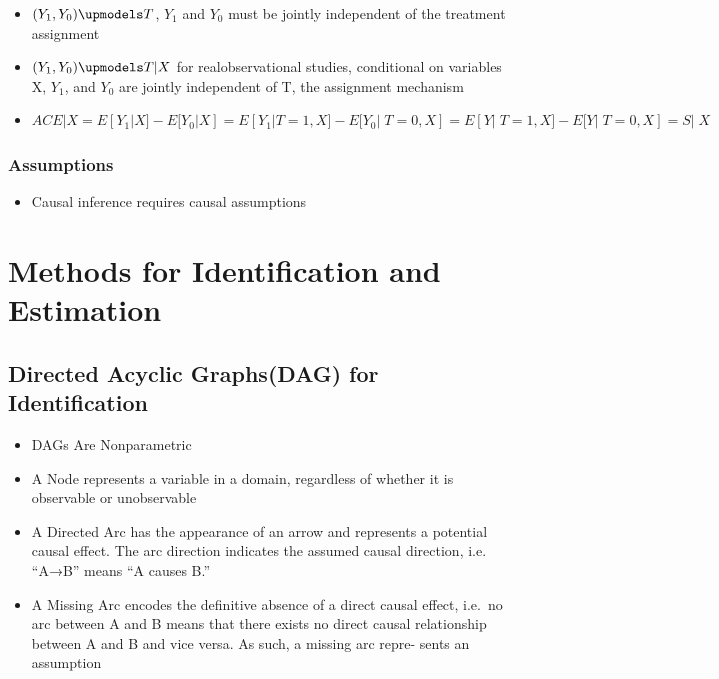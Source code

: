 \documentclass[]{book}
\providecommand{\tightlist}{%
  \setlength{\itemsep}{0pt}\setlength{\parskip}{0pt}}
\begin{document}
\begin{itemize}
\tightlist
\item
  \((Y_1,Y_0) \upmodels T\), \(Y_1\) and \(Y_0\) must be jointly independent of the treatment assignment
\item
  \((Y_1,Y_0) \upmodels T|X\) for realobservational studies, conditional on variables X, \(Y_1\), and \(Y_0\) are jointly independent of T, the assignment mechanism
\item
  \(ACE|X = E[Y_1|X] - E[Y_0|X] = E[Y_1|T=1,X] - E[Y_0|􏰀T = 0,X] = E[Y|􏰀T = 1,X] - E[Y|􏰀T =0,X] = S|􏰀X\)
\end{itemize}

\hypertarget{assumptions}{%
\subsubsection{Assumptions}\label{assumptions}}

\begin{itemize}
\tightlist
\item
  Causal inference requires causal assumptions
\end{itemize}

\hypertarget{methods-for-identification-and-estimation}{%
\section{Methods for Identification and Estimation}\label{methods-for-identification-and-estimation}}

\hypertarget{directed-acyclic-graphsdag-for-identification}{%
\subsection{Directed Acyclic Graphs(DAG) for Identification}\label{directed-acyclic-graphsdag-for-identification}}

\begin{itemize}
\tightlist
\item
  DAGs Are Nonparametric
\item
  A Node represents a variable in a domain, regardless of whether it is observable or unobservable
\item
  A Directed Arc has the appearance of an arrow and represents a potential causal effect. The arc direction indicates the assumed causal direction, i.e. ``A→B'' means ``A causes B.''
\item
  A Missing Arc encodes the definitive absence of a direct causal effect, i.e.~no arc between A and B means that there exists no direct causal relationship between A and B and vice versa. As such, a missing arc repre- sents an assumption
\end{itemize}
\end{document}
